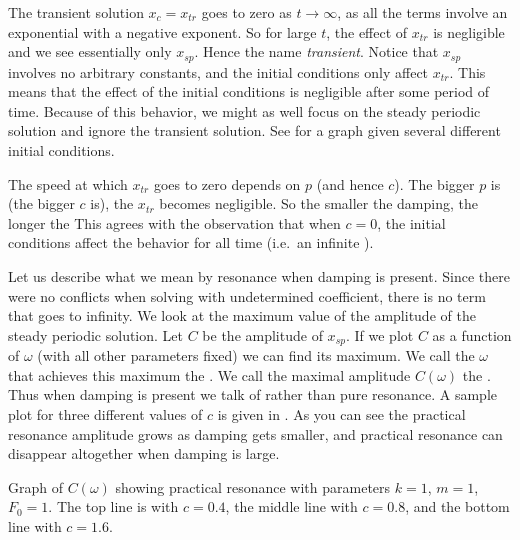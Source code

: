 The transient solution $x_c = x_{tr}$ goes to zero as $t \to \infty$,
as all the terms involve an exponential with a negative exponent.  So
for large $t$, the effect of $x_{tr}$ is negligible and we see essentially
only $x_{sp}$.
Hence the name \emph{transient}.
Notice that $x_{sp}$ involves no arbitrary constants, and
the initial conditions only affect $x_{tr}$.  This means that the effect
of the initial conditions is negligible after some period of time.
Because of this behavior,
we might as well focus on the
steady periodic solution and ignore the transient solution.  See
 for a graph given several different initial conditions.


The speed at which $x_{tr}$ goes to zero depends on $p$ (and
hence $c$).  The
bigger $p$ is (the bigger $c$ is), the  $x_{tr}$ becomes negligible. 
So the smaller the damping, the longer the   This agrees
with the observation that when $c=0$, the initial conditions affect the
behavior for all time (i.e.\ an infinite ).

\medskip

Let us describe what we mean by resonance when damping is present.
Since there were no conflicts when solving with undetermined coefficient,
there is no term that goes to infinity.  We look at the
maximum value of the amplitude of the steady periodic solution.
Let $C$ be the amplitude of $x_{sp}$.
If we plot $C$ as a function of $\omega$ (with all other
parameters fixed) we can find its maximum.
We call the $\omega$ that achieves this maximum
the \emph{}.
We call the maximal amplitude $C(\omega)$
the \emph{}.
Thus when damping is present we talk of \emph{}
rather than pure resonance.
A sample plot for three different
values of $c$ is given in .  As you can see the
practical resonance amplitude grows as damping gets smaller, and 
practical resonance can disappear altogether when damping is large.

\begin{myfig}
\capstart
{}
\caption{Graph of $C(\omega)$ showing practical resonance with parameters
$k=1$, $m=1$, $F_0 = 1$. The top line is with $c=0.4$, the middle line with
$c=0.8$, and the bottom line with
$c=1.6$.\label{3.6:pracresfig}}
\end{myfig}

